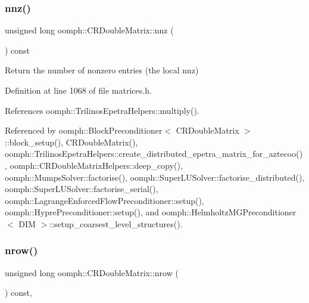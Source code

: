 \mbox{\label{classoomph_1_1CRDoubleMatrix_a9482dafc0a17ebc5b7431369d8d07565}} 
\subsubsection{\texorpdfstring{nnz()}{nnz()}}
{\footnotesize\ttfamily unsigned long oomph\+::\+C\+R\+Double\+Matrix\+::nnz (\begin{DoxyParamCaption}{ }\end{DoxyParamCaption}) const\hspace{0.3cm}{\ttfamily [inline]}}



Return the number of nonzero entries (the local nnz) 



Definition at line 1068 of file matrices.\+h.



References oomph\+::\+Trilinos\+Epetra\+Helpers\+::multiply().



Referenced by oomph\+::\+Block\+Preconditioner$<$ C\+R\+Double\+Matrix $>$\+::block\+\_\+setup(), C\+R\+Double\+Matrix(), oomph\+::\+Trilinos\+Epetra\+Helpers\+::create\+\_\+distributed\+\_\+epetra\+\_\+matrix\+\_\+for\+\_\+aztecoo(), oomph\+::\+C\+R\+Double\+Matrix\+Helpers\+::deep\+\_\+copy(), oomph\+::\+Mumps\+Solver\+::factorise(), oomph\+::\+Super\+L\+U\+Solver\+::factorise\+\_\+distributed(), oomph\+::\+Super\+L\+U\+Solver\+::factorise\+\_\+serial(), oomph\+::\+Lagrange\+Enforced\+Flow\+Preconditioner\+::setup(), oomph\+::\+Hypre\+Preconditioner\+::setup(), and oomph\+::\+Helmholtz\+M\+G\+Preconditioner$<$ D\+I\+M $>$\+::setup\+\_\+coarsest\+\_\+level\+\_\+structures().

\mbox{\label{classoomph_1_1CRDoubleMatrix_abd8d231b0549540144b4739a667b1e75}} 
\subsubsection{\texorpdfstring{nrow()}{nrow()}}
{\footnotesize\ttfamily unsigned long oomph\+::\+C\+R\+Double\+Matrix\+::nrow (\begin{DoxyParamCaption}{ }\end{DoxyParamCaption}) const\hspace{0.3cm}{\ttfamily [inline]}, {\ttfamily [virtual]}}



